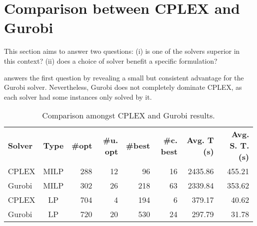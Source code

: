 \section{Comparison between CPLEX and Gurobi}
\label{sec:results_comparing_solvers}

This section aims to answer two questions: (i) is one of the solvers superior in this context? (ii) does a choice of solver benefit a specific formulation?

 answers the first question by revealing a small but consistent advantage for the Gurobi solver.
Nevertheless, Gurobi does not completely dominate CPLEX, as each solver had some instances only solved by it.

\begin{table}[h]
  \center
  \caption{Comparison amongst CPLEX and Gurobi results.}
  \setlength{}
  \begin{tabular}{lcrrrrrr}
    \hline\hline
    \textbf{Solver} & \textbf{Type} & \textbf{\#opt} & \textbf{\#u. opt} & \textbf{\#best} & \textbf{\#c. best} & \textbf{Avg. T (s)} & \textbf{Avg. S. T. (s)} \\\cmidrule(lr){1-2}\cmidrule(lr){3-8}
     CPLEX & MILP & 288 & 12 &  96 & 16 & 2435.86 & 455.21 \\
    Gurobi & MILP & 302 & 26 & 218 & 63 & 2339.84 & 353.62 \\
     CPLEX & LP  & 704 &  4 & 194 &  6 &  379.17 &  40.62 \\
    Gurobi & LP  & 720 & 20 & 530 & 24 &  297.79 &  31.78 \\\hline\hline
  \end{tabular}
  \label{tab:cplex_vs_gurobi}
\end{table}

